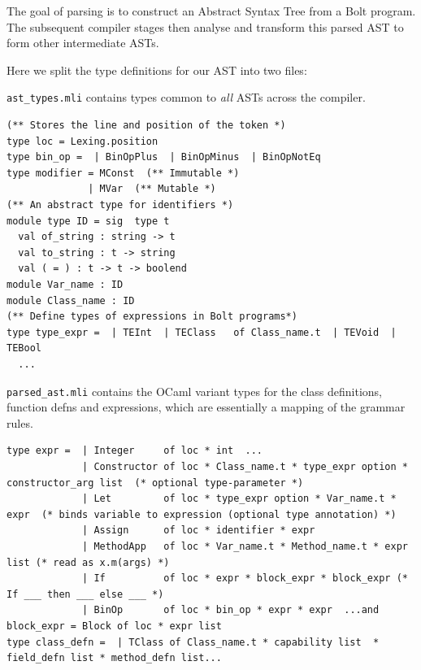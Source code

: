 The goal of parsing is to construct an Abstract Syntax Tree from a Bolt
program. The subsequent compiler stages then analyse and transform this
parsed AST to form other intermediate ASTs.

Here we split the type definitions for our AST into two files:

\texttt{ast\_types.mli} contains types common to \emph{all} ASTs across
the compiler.
%
%

\begin{lstlisting}[language=caml,caption={ast\_types.mli}]
(** Stores the line and position of the token *)
type loc = Lexing.position
type bin_op =  | BinOpPlus  | BinOpMinus  | BinOpNotEq
type modifier = MConst  (** Immutable *) 
              | MVar  (** Mutable *)
(** An abstract type for identifiers *)
module type ID = sig  type t
  val of_string : string -> t  
  val to_string : t -> string  
  val ( = ) : t -> t -> boolend
module Var_name : ID
module Class_name : ID
(** Define types of expressions in Bolt programs*)
type type_expr =  | TEInt  | TEClass   of Class_name.t  | TEVoid  | TEBool
  ...
\end{lstlisting}

\texttt{parsed\_ast.mli} contains the OCaml variant types for the class
definitions, function defns and expressions, which are essentially a
mapping of the grammar rules.

%

\begin{lstlisting}[language=caml,caption={{parsed\_ast.mli}}]
type expr =  | Integer     of loc * int  ...  
             | Constructor of loc * Class_name.t * type_expr option * constructor_arg list  (* optional type-parameter *)  
             | Let         of loc * type_expr option * Var_name.t * expr  (* binds variable to expression (optional type annotation) *)  
             | Assign      of loc * identifier * expr  
             | MethodApp   of loc * Var_name.t * Method_name.t * expr list (* read as x.m(args) *)  
             | If          of loc * expr * block_expr * block_expr (* If ___ then ___ else ___ *)  
             | BinOp       of loc * bin_op * expr * expr  ...and block_expr = Block of loc * expr list
type class_defn =  | TClass of Class_name.t * capability list  * field_defn list * method_defn list...
\end{lstlisting}

